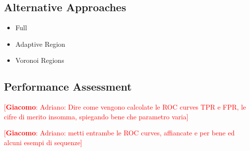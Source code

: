 \documentclass{llncs}
\newcommand{\gi}[1]{{\textcolor{red}{[\small \textbf{Giacomo}: #1]}}}
\begin{document}
\subsection{Alternative Approaches}\label{subsec:AlternativeApproaches}
\begin{itemize}
\item Full
\item Adaptive Region
\item Voronoi Regions
\end{itemize}

\subsection{Performance Assessment}
\gi{Adriano: Dire come vengono calcolate le ROC curves TPR e FPR, le cifre di merito insomma, spiegando bene che parametro varia}

\gi{Adriano: metti entrambe le ROC curves, affiancate e per bene ed alcuni esempi di sequenze}
\end{document}
